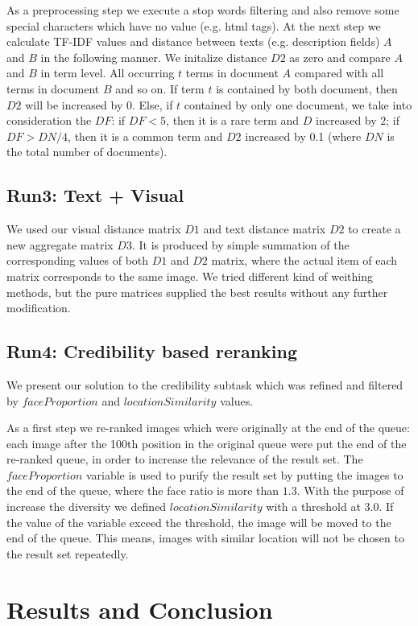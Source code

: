 \documentclass{sig-alternate}
\begin{document}
As a preprocessing step we execute a stop words filtering and also remove some special characters which have no value (e.g. html tags). At the next step we calculate TF-IDF values and distance between texts (e.g. description fields) $A$ and $B$ in the following manner. We initalize distance $D2$ as zero and compare $A$ and $B$ in term level. All occurring $t$ terms in document $A$ compared with all terms in document $B$ and so on. If term $t$ is contained by both document, then $D2$ will be increased by $0$. Else, if $t$ contained by only one document, we take into consideration the $DF$: if $DF<5$, then it is a rare term and $D$ increased by $2$; if $DF>DN/4$, then it is a common term and  $D2$ increased by 0.1 (where $DN$ is the total number of documents).

\subsection{Run3: Text + Visual}
We used our visual distance matrix $D1$ and text distance matrix $D2$ to create a new aggregate matrix $D3$. It is produced by simple summation of the corresponding values of both $D1$ and $D2$ matrix, where the actual item of each matrix corresponds to the same image. We tried different kind of weithing methods, but the pure matrices supplied the best results without any further modification.

\subsection{Run4: Credibility based reranking}
We present our solution to the credibility subtask which was refined and filtered by $faceProportion$ and $locationSimilarity$ values.

As a first step we re-ranked images which were originally at the end of the queue: each image after the 100th position in the original queue were put the end of the re-ranked queue, in order to increase the relevance of the result set. The $faceProportion$ variable is used to purify the result set by putting the images to the end of the queue, where the face ratio is more than $1.3$. With the purpose of increase the diversity we defined $locationSimilarity$ with a threshold at $3.0$. If the value of the variable exceed the threshold, the image will be moved to the end of the queue. This means, images with similar location  will not be chosen to the result set repeatedly.

\section{Results and Conclusion}
\end{document}
